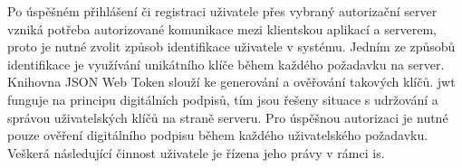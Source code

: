 Po úspěšném přihlášení či registraci uživatele přes vybraný autorizační server vzniká potřeba autorizované komunikace mezi klientskou aplikací a serverem, proto je nutné zvolit způsob identifikace uživatele v systému. Jedním ze způsobů identifikace je využívání unikátního klíče během každého požadavku na server. Knihovna JSON Web Token slouží ke generování a ověřování takových klíčů. \gls{jwt} funguje na principu digitálních podpisů, tím jsou řešeny situace s udržování a správou uživatelských klíčů na straně serveru. Pro úspěšnou autorizaci je nutné pouze ověření digitálního podpisu během každého uživatelského požadavku. Veškerá následující činnost uživatele je řízena jeho právy v rámci \gls{is}.

